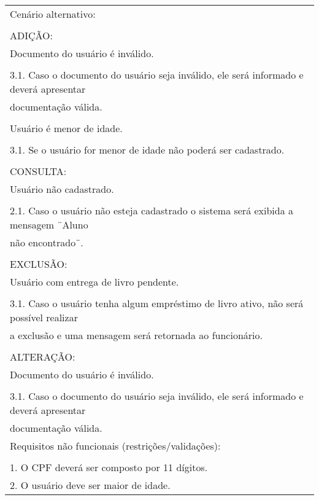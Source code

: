 \begin{longtable}{|l|}
Cenário alternativo:\\ \\ ADIÇÃO:\\ Documento do usuário é inválido.\\        \\ 3.1. Caso o documento do usuário seja inválido, ele será informado e deverá apresentar  \\ documentação válida.\\ \\Usuário é menor de idade.\\ \\3.1. Se o usuário for menor de idade não poderá ser cadastrado.\\ \\ CONSULTA:\\ Usuário não cadastrado.\\ \\ 2.1. Caso o usuário não esteja cadastrado o sistema será exibida a mensagem ¨Aluno\\ não encontrado¨.\\ \\ EXCLUSÃO:\\ Usuário com entrega de livro pendente.\\ \\ 3.1. Caso o usuário tenha algum empréstimo de livro ativo, não será possível realizar \\ a exclusão e uma mensagem será retornada ao funcionário. \\ \\ ALTERAÇÃO:\\ Documento do usuário é inválido.\\ \\ 3.1. Caso o documento do usuário seja inválido, ele será informado e deverá apresentar \\ documentação válida.\\ \hline
Requisitos não funcionais (restrições/validações):\\ \\         1. O CPF deverá ser composto por 11 dígitos.\\         2. O usuário deve ser maior de idade.\\ \hline
\end{longtable}

